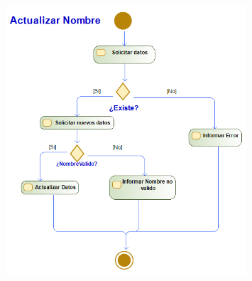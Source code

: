 \begin{figure}[H]
	\centering
	\includegraphics[width=0.8\textwidth]{Use_Cases/Actualizar Nombre.png}
\end{figure}
\newpage
